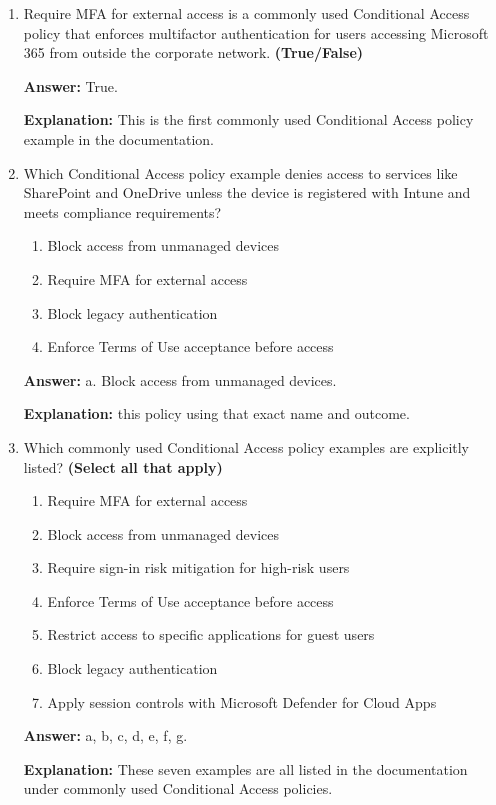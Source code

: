 \documentclass[10pt]{article}
\begin{document}
\begin{enumerate}[leftmargin=*]
\textbf{Explanation:} restricting downloads, restricting data copying, and using session context with Defender for Cloud Apps.

\item Require MFA for external access is a commonly used Conditional Access policy that enforces multifactor authentication for users accessing Microsoft 365 from outside the corporate network. \textbf{(True/False)}

\textbf{Answer:} True.

\textbf{Explanation:} This is the first commonly used Conditional Access policy example in the documentation.

\item Which Conditional Access policy example denies access to services like SharePoint and OneDrive unless the device is registered with Intune and meets compliance requirements?
\begin{enumerate}[label=\alph*., leftmargin=1.5em]
\item Block access from unmanaged devices
\item Require MFA for external access
\item Block legacy authentication
\item Enforce Terms of Use acceptance before access
\end{enumerate}
\textbf{Answer:} a. Block access from unmanaged devices.

\textbf{Explanation:} this policy using that exact name and outcome.

\item Which commonly used Conditional Access policy examples are explicitly listed? \textbf{(Select all that apply)}
\begin{enumerate}[label=\alph*., leftmargin=1.5em]
\item Require MFA for external access
\item Block access from unmanaged devices
\item Require sign-in risk mitigation for high-risk users
\item Enforce Terms of Use acceptance before access
\item Restrict access to specific applications for guest users
\item Block legacy authentication
\item Apply session controls with Microsoft Defender for Cloud Apps
\end{enumerate}
\textbf{Answer:} a, b, c, d, e, f, g.

\textbf{Explanation:} These seven examples are all listed in the documentation under commonly used Conditional Access policies.


\end{enumerate}
\end{document}
